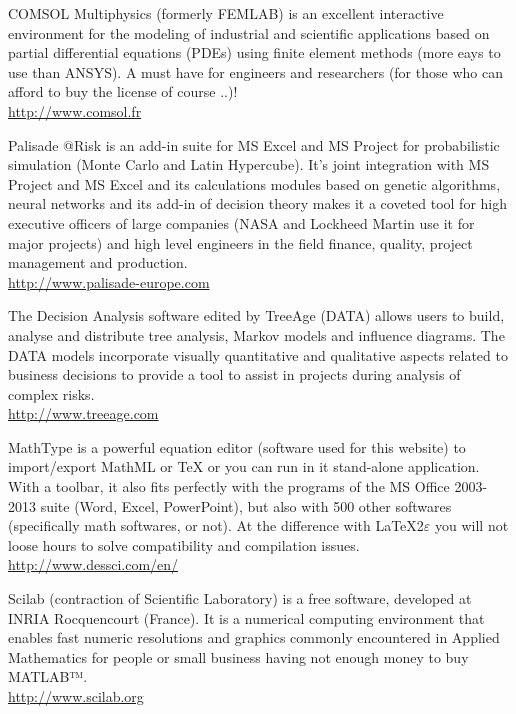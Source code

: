 	{\Large {}}{\Large {}}{\Large {}}{\Large {}}COMSOL Multiphysics (formerly FEMLAB) is an excellent interactive environment for the modeling of industrial and scientific applications based on partial differential equations (PDEs) using finite element methods (more eays to use than ANSYS). A must have for engineers and researchers (for those who can afford to buy the license of course ..)!\\
	\href{http://www.comsol.fr}{\color{blue}http://www.comsol.fr}
	
	{\Large {}}{\Large {}}{\Large {}}{\Large {}} Palisade @Risk is an add-in suite for MS Excel and MS Project for probabilistic simulation (Monte Carlo and Latin Hypercube). It's joint integration with MS Project and MS Excel and its calculations modules based on genetic algorithms, neural networks and its add-in of decision theory makes it a coveted tool for high executive officers of large companies (NASA and Lockheed Martin use it for major projects) and high level engineers in the field finance, quality, project management and production.\\
	\href{http://www.palisade-europe.com}{\color{blue}http://www.palisade-europe.com}
	
	{\Large {}}{\Large {}}{\Large {}}{\Large {}} The Decision Analysis software edited by TreeAge (DATA) allows users to build, analyse and distribute tree analysis, Markov models and influence diagrams. The DATA models incorporate visually quantitative and qualitative aspects related to business decisions to provide a tool to assist in projects during analysis of complex risks.\\
	\href{http://www.treeage.com}{\color{blue}http://www.treeage.com}
	
	{\Large {}}{\Large {}}{\Large {}}{\Large {}} MathType is a powerful equation editor (software used for this website) to import/export MathML or TeX or you can run in it stand-alone application. With a toolbar, it also fits perfectly with the programs of the MS Office 2003-2013 suite (Word, Excel, PowerPoint), but also with 500 other softwares (specifically math softwares, or not). At the difference with \LaTeX 2$\varepsilon$ you will not loose hours to solve compatibility and compilation issues.\\ 
	\href{http://www.dessci.com/en/}{\color{blue}http://www.dessci.com/en/}
	
	{\Large {}}{\Large {}}{\Large {}} Scilab (contraction of Scientific Laboratory) is a free software, developed at INRIA Rocquencourt (France). It is a numerical computing environment that enables fast numeric resolutions and graphics commonly encountered in Applied Mathematics for people or small business having not enough money to buy MATLAB™.\\
	\href{http://www.scilab.org}{\color{blue}http://www.scilab.org}
	
